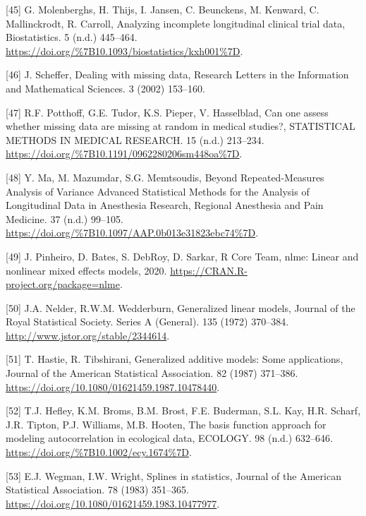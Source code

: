 \documentclass[
]{article}
\begin{document}
\leavevmode\hypertarget{ref-molenberghs2004}{}%
{[}45{]} G. Molenberghs, H. Thijs, I. Jansen, C. Beunckens, M. Kenward, C. Mallinckrodt, R. Carroll, Analyzing incomplete longitudinal clinical trial data, Biostatistics. 5 (n.d.) 445--464. \url{https://doi.org/\%7B10.1093/biostatistics/kxh001\%7D}.

\leavevmode\hypertarget{ref-scheffer2002}{}%
{[}46{]} J. Scheffer, Dealing with missing data, Research Letters in the Information and Mathematical Sciences. 3 (2002) 153--160.

\leavevmode\hypertarget{ref-potthoff2006}{}%
{[}47{]} R.F. Potthoff, G.E. Tudor, K.S. Pieper, V. Hasselblad, Can one assess whether missing data are missing at random in medical studies?, STATISTICAL METHODS IN MEDICAL RESEARCH. 15 (n.d.) 213--234. \url{https://doi.org/\%7B10.1191/0962280206sm448oa\%7D}.

\leavevmode\hypertarget{ref-ma2012}{}%
{[}48{]} Y. Ma, M. Mazumdar, S.G. Memtsoudis, Beyond Repeated-Measures Analysis of Variance Advanced Statistical Methods for the Analysis of Longitudinal Data in Anesthesia Research, Regional Anesthesia and Pain Medicine. 37 (n.d.) 99--105. \url{https://doi.org/\%7B10.1097/AAP.0b013e31823ebc74\%7D}.

\leavevmode\hypertarget{ref-nlme}{}%
{[}49{]} J. Pinheiro, D. Bates, S. DebRoy, D. Sarkar, R Core Team, nlme: Linear and nonlinear mixed effects models, 2020. \url{https://CRAN.R-project.org/package=nlme}.

\leavevmode\hypertarget{ref-nelder1972}{}%
{[}50{]} J.A. Nelder, R.W.M. Wedderburn, Generalized linear models, Journal of the Royal Statistical Society. Series A (General). 135 (1972) 370--384. \url{http://www.jstor.org/stable/2344614}.

\leavevmode\hypertarget{ref-hastie1987}{}%
{[}51{]} T. Hastie, R. Tibshirani, Generalized additive models: Some applications, Journal of the American Statistical Association. 82 (1987) 371--386. \url{https://doi.org/10.1080/01621459.1987.10478440}.

\leavevmode\hypertarget{ref-hefley2017}{}%
{[}52{]} T.J. Hefley, K.M. Broms, B.M. Brost, F.E. Buderman, S.L. Kay, H.R. Scharf, J.R. Tipton, P.J. Williams, M.B. Hooten, The basis function approach for modeling autocorrelation in ecological data, ECOLOGY. 98 (n.d.) 632--646. \url{https://doi.org/\%7B10.1002/ecy.1674\%7D}.

\leavevmode\hypertarget{ref-wegman1983}{}%
{[}53{]} E.J. Wegman, I.W. Wright, Splines in statistics, Journal of the American Statistical Association. 78 (1983) 351--365. \url{https://doi.org/10.1080/01621459.1983.10477977}.
\end{document}
